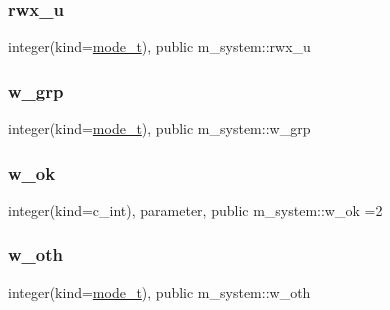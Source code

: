 \mbox{\label{namespacem__system_a126dc96188cde6e9932e1775868b3059}} 
\subsubsection{\texorpdfstring{rwx\+\_\+u}{rwx\_u}}
{\footnotesize\ttfamily integer(kind=\mbox{\hyperlink{namespacem__system_abdb5cc27c945379d844db4830d499050}{mode\+\_\+t}}), public m\+\_\+system\+::rwx\+\_\+u}

\mbox{\label{namespacem__system_afbbb4a0d04bc0dbaad651a6ab04ffaef}} 
\subsubsection{\texorpdfstring{w\+\_\+grp}{w\_grp}}
{\footnotesize\ttfamily integer(kind=\mbox{\hyperlink{namespacem__system_abdb5cc27c945379d844db4830d499050}{mode\+\_\+t}}), public m\+\_\+system\+::w\+\_\+grp}

\mbox{\label{namespacem__system_a8f34e61e94106b90ca48b9ef1165474c}} 
\subsubsection{\texorpdfstring{w\+\_\+ok}{w\_ok}}
{\footnotesize\ttfamily integer(kind=c\+\_\+int), parameter, public m\+\_\+system\+::w\+\_\+ok =2}

\mbox{\label{namespacem__system_a82b69c635bb9cd191b867efdf2003d9b}} 
\subsubsection{\texorpdfstring{w\+\_\+oth}{w\_oth}}
{\footnotesize\ttfamily integer(kind=\mbox{\hyperlink{namespacem__system_abdb5cc27c945379d844db4830d499050}{mode\+\_\+t}}), public m\+\_\+system\+::w\+\_\+oth}

